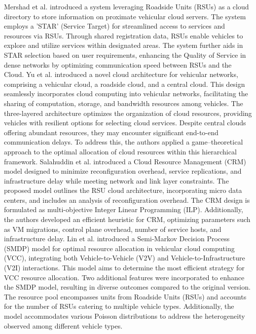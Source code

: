 \documentclass[sensors,article,accept,moreauthors,pdftex]{Definitions/mdpi}
\begin{document}
Mershad et al. \cite{Mershad2013} introduced a system leveraging Roadside Units (RSUs) as a cloud directory to store information on proximate vehicular cloud servers. The system employs a 'STAR' (Service Target) for streamlined access to services and resources via RSUs. Through shared registration data, RSUs enable vehicles to explore and utilize services within designated areas. The system further aids in STAR selection based on user requirements, enhancing the Quality of Service in dense networks by optimizing communication speed between RSUs and the Cloud.
Yu et al. \cite{Yu2013} introduced a novel cloud architecture for vehicular networks, comprising a vehicular cloud, a roadside cloud, and a central cloud. This design seamlessly incorporates cloud computing into vehicular networks, facilitating the sharing of computation, storage, and bandwidth resources among vehicles. The three-layered architecture optimizes the organization of cloud resources, providing vehicles with resilient options for selecting cloud services. Despite central clouds offering abundant resources, they may encounter significant end-to-end communication delays. To address this, the authors applied a game--theoretical approach to the optimal allocation of cloud resources within this hierarchical framework.
Salahuddin et al. \cite{Salahuddin2014} introduced a Cloud Resource Management (CRM) model designed to minimize reconfiguration overhead, service replications, and infrastructure delay while meeting network and link layer constraints. The proposed model outlines the RSU cloud architecture, incorporating micro data centers, and includes an analysis of reconfiguration overhead. The CRM design is formulated as multi-objective Integer Linear Programming (ILP). Additionally, the authors developed an efficient heuristic for CRM, optimizing parameters such as VM migrations, control plane overhead, number of service hosts, and infrastructure delay.
\linebreak  Lin et al. \cite{Lin2018} introduced a Semi-Markov Decision Process (SMDP) model for optimal resource allocation in vehicular cloud computing (VCC), integrating both Vehicle-to-Vehicle (V2V) and Vehicle-to-Infrastructure (V2I) interactions. This model aims to determine the most efficient strategy for VCC resource allocation. Two additional features were incorporated to enhance the SMDP model, resulting in diverse outcomes compared to the original version. The resource pool encompasses units from Roadside Units (RSUs) and accounts for the number of RSUs catering to multiple vehicle types. Additionally, the model accommodates various Poisson distributions to address the heterogeneity observed among different vehicle types.
\end{document}
